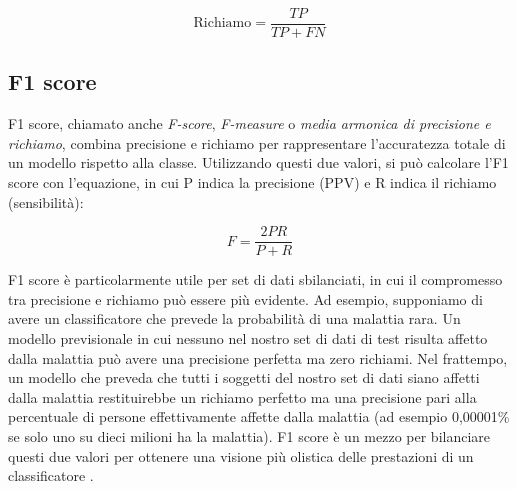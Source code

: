 \begin{equation}
    \text{Richiamo} = \frac{TP}{TP+FN}
\end{equation}

\subsection{F1 score}
F1 score, chiamato anche \textit{F-score}, \textit{F-measure} o 
\textit{media armonica di precisione e richiamo}, combina precisione e 
richiamo per rappresentare l'accuratezza totale 
di un modello rispetto alla classe. Utilizzando questi due valori, 
si può calcolare l'F1 score con l'equazione, in cui P indica la precisione 
(PPV) e R indica il richiamo (sensibilità):

\begin{equation}
    F = \frac{2PR}{P+R}
\end{equation}

F1 score è particolarmente utile per set di dati sbilanciati, 
in cui il compromesso tra precisione e richiamo può essere più evidente. 
Ad esempio, supponiamo di avere un classificatore che prevede la probabilità 
di una malattia rara. Un modello previsionale in cui nessuno nel nostro set di 
dati di test risulta affetto dalla malattia può avere una precisione perfetta ma 
zero richiami. Nel frattempo, un modello che preveda che tutti i soggetti del 
nostro set di dati siano affetti dalla malattia restituirebbe un richiamo 
perfetto ma una precisione pari alla percentuale di persone effettivamente 
affette dalla malattia (ad esempio 0,00001\% se solo uno su dieci milioni ha la malattia). 
F1 score è un mezzo per bilanciare questi due valori per ottenere una visione più 
olistica delle prestazioni di un classificatore \cite{Confusion_Matrix_e_metrics1,Confusion_Matrix_e_metrics2}.

